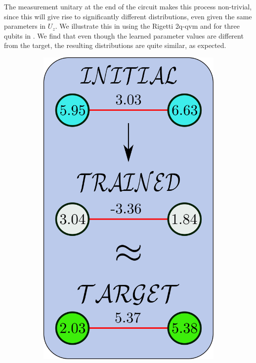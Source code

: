 \noindent The measurement unitary at the end of the circuit makes this process non-trivial, since this will give rise to significantly different distributions, even given the same parameters in $U_z$. We illustrate this in  using the Rigetti {\selectfont 2q-qvm} and for three qubits in . We find that even though the learned parameter values are different from the target, the resulting distributions are quite similar, as expected.

\begin{figure}[ht]
\centering
\begin{subfigure}[t]{0.12\textwidth}
    \centering
    \includegraphics[width=\textwidth, height = 1.8\textwidth]{images/FIG_6a_circuit_init_two_qubits_vertical.pdf}

\end{subfigure}
\end{figure}
